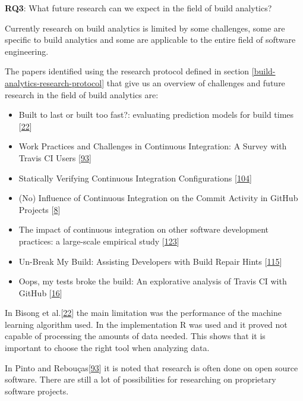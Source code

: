 \documentclass[]{book}
\providecommand{\tightlist}{%
  \setlength{\itemsep}{0pt}\setlength{\parskip}{0pt}}
\begin{document}
\textbf{RQ3}: What future research can we expect in the field of build
analytics?

Currently research on build analytics is limited by some challenges,
some are specific to build analytics and some are applicable to the
entire field of software engineering.

The papers identified using the research protocol defined in section
\ref{build-analytics-research-protocol} that give us an overview of
challenges and future research in the field of build analytics are:

\begin{itemize}
\tightlist
\item
  Built to last or built too fast?: evaluating prediction models for
  build times {[}\protect\hyperlink{ref-bisong2017built}{22}{]}
\item
  Work Practices and Challenges in Continuous Integration: A Survey with
  Travis CI Users {[}\protect\hyperlink{ref-pinto2018work}{93}{]}
\item
  Statically Verifying Continuous Integration Configurations
  {[}\protect\hyperlink{ref-santolucito2018statically}{104}{]}
\item
  (No) Influence of Continuous Integration on the Commit Activity in
  GitHub Projects {[}\protect\hyperlink{ref-baltes2018no}{8}{]}
\item
  The impact of continuous integration on other software development
  practices: a large-scale empirical study
  {[}\protect\hyperlink{ref-zhao2017impact}{123}{]}
\item
  Un-Break My Build: Assisting Developers with Build Repair Hints
  {[}\protect\hyperlink{ref-vassallo2018break}{115}{]}
\item
  Oops, my tests broke the build: An explorative analysis of Travis CI
  with GitHub {[}\protect\hyperlink{ref-beller2017oops}{16}{]}
\end{itemize}

In Bisong et al.{[}\protect\hyperlink{ref-bisong2017built}{22}{]} the
main limitation was the performance of the machine learning algorithm
used. In the implementation R was used and it proved not capable of
processing the amounts of data needed. This shows that it is important
to choose the right tool when analyzing data.

In Pinto and Rebouças{[}\protect\hyperlink{ref-pinto2018work}{93}{]} it
is noted that research is often done on open source software. There are
still a lot of possibilities for researching on proprietary software
projects.
\end{document}
